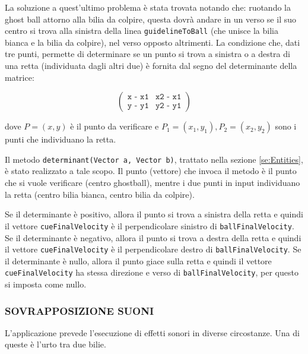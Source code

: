 \documentclass[12pt,a4paper]{report}
\begin{document}
\vspace{3mm}

La soluzione a quest'ultimo problema è stata trovata notando che: ruotando la ghost ball attorno alla bilia da colpire, questa dovrà andare in un verso se il suo centro si trova alla sinistra della linea \texttt{guidelineToBall} (che unisce la bilia bianca e la bilia da colpire), nel verso opposto altrimenti.
La condizione che, dati tre punti, permette di determinare se un punto si trova a sinistra o a destra di una retta (individuata dagli altri due) è fornita dal segno del determinante della matrice:

\[
\begin{pmatrix}
\texttt{x - x1} & \texttt{x2 - x1}\\
\texttt{y - y1} & \texttt{y2 - y1}
\end{pmatrix}
\]

dove $P = (x, y)$ è il punto da verificare e $P_1 = (x_1, y_1), P_2 = (x_2, y_2)$ sono i punti che individuano la retta.\cite{PointSideLineMath}\cite{PointSideLineCode}

\vspace{3mm}

Il metodo \texttt{determinant(Vector a, Vector b)}, trattato nella sezione \ref{se:Entities}, è stato realizzato a tale scopo.
Il punto (vettore) che invoca il metodo è il punto che si vuole verificare (centro ghostball), mentre i due punti in input individuano la retta (centro bilia bianca, centro bilia da colpire).

\vspace{3mm}

Se il determinante è positivo, allora il punto si trova a sinistra della retta e quindi il vettore \texttt{cueFinalVelocity} è il perpendicolare sinistro di \texttt{ballFinalVelocity}.
Se il determinante è negativo, allora il punto si trova a destra della retta e quindi il vettore \texttt{cueFinalVelocity} è il perpendicolare destro di \texttt{ballFinalVelocity}.
Se il determinante è nullo, allora il punto giace sulla retta e quindi il vettore \texttt{cueFinalVelocity} ha stessa direzione e verso di \texttt{ballFinalVelocity}, per questo si imposta come nullo.

\subsubsection*{SOVRAPPOSIZIONE SUONI}
L'applicazione prevede l'esecuzione di effetti sonori in diverse circostanze. Una di queste è l'urto tra due bilie.
\end{document}
